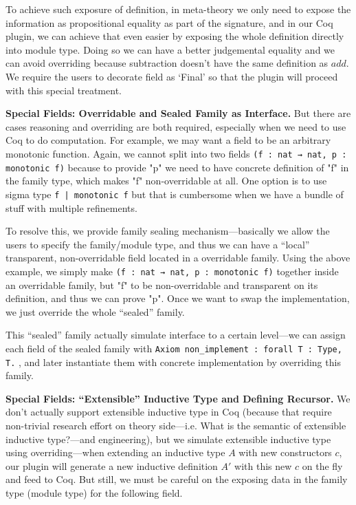 To achieve such exposure of definition, in meta-theory we only need to expose the information as propositional equality as part of the signature, and in our Coq plugin, we can achieve that even easier by exposing the whole definition directly into module type. Doing so we can have a better judgemental equality and we can avoid overriding because subtraction doesn't have the same definition as $add$. We require the users to decorate field as `Final' so that the plugin will proceed with this special treatment.

\textbf{Special Fields: Overridable and Sealed Family as Interface.}
But there are cases reasoning and overriding are both required, especially when we need to use Coq to do computation. For example, we may want a field to be an arbitrary monotonic function. Again, we cannot split into two fields \texttt{(f : nat → nat, p : monotonic f)} because to provide "p" we need to have concrete definition of "f" in the family type, which makes "f" non-overridable at all. One option is to use sigma type \texttt{{f | monotonic f}} but that is cumbersome when we have a bundle of stuff with multiple refinements. 

To resolve this, we provide family sealing mechanism---basically we allow the users to specify the family/module type, and thus we can have a ``local'' transparent, non-overridable field located in a overridable family. Using the above example, we simply make \texttt{(f : nat → nat, p : monotonic f)} together inside an overridable family, but "f" to be non-overridable and transparent on its definition, and thus we can prove "p". Once we want to swap the implementation, we just override the whole ``sealed'' family. 

This ``sealed'' family actually simulate interface to a certain level---we can assign each field of the sealed family with \texttt{Axiom non_implement : forall {T : Type}, T.}  , and later instantiate them with concrete implementation by overriding this family.



\textbf{Special Fields: ``Extensible'' Inductive Type and Defining Recursor.}
We don't actually support extensible inductive type in Coq (because that require non-trivial research effort on theory side---i.e. {What is the semantic of extensible inductive type?}---and engineering), but we simulate extensible inductive type using overriding---when extending an inductive type $A$ with new constructors $c$, our plugin will generate a new inductive definition $A'$ with this new $c$ on the fly and feed to Coq.  But still, we must be careful on the exposing data in the family type (module type) for the following field.  

